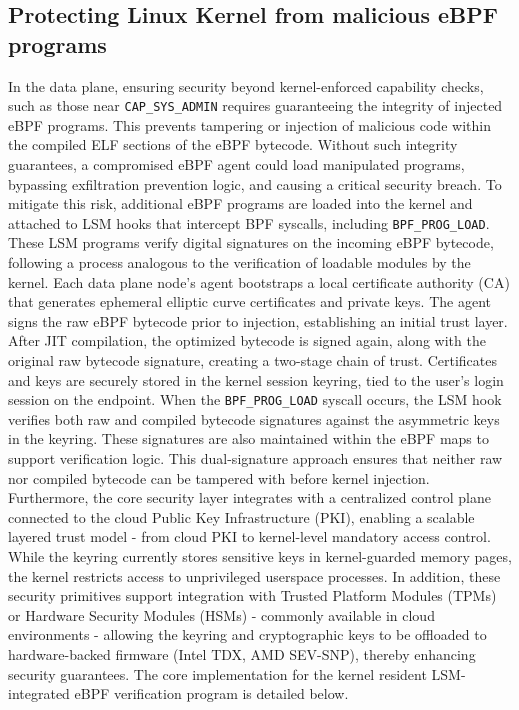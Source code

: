 \documentclass [11pt, proquest] {uwthesis}[2020/02/24]
\begin{document}
\subsection{Protecting Linux Kernel from malicious eBPF programs}
In the data plane, ensuring security beyond kernel-enforced capability checks, such as those near \texttt{CAP\_SYS\_ADMIN} requires guaranteeing the integrity of injected eBPF programs. This prevents tampering or injection of malicious code within the compiled ELF sections of the eBPF bytecode. Without such integrity guarantees, a compromised eBPF agent could load manipulated programs, bypassing exfiltration prevention logic, and causing a critical security breach.
To mitigate this risk, additional eBPF programs are loaded into the kernel and attached to LSM hooks that intercept BPF syscalls, including  \texttt{BPF\_PROG\_LOAD}. These LSM programs verify digital signatures on the incoming eBPF bytecode, following a process analogous to the verification of loadable modules by the kernel.
Each data plane node’s agent bootstraps a local certificate authority (CA) that generates ephemeral elliptic curve certificates and private keys. The agent signs the raw eBPF bytecode prior to injection, establishing an initial trust layer. After JIT compilation, the optimized bytecode is signed again, along with the original raw bytecode signature, creating a two-stage chain of trust. Certificates and keys are securely stored in the kernel session keyring, tied to the user’s login session on the endpoint.
When the \texttt{BPF\_PROG\_LOAD} syscall occurs, the LSM hook verifies both raw and compiled bytecode signatures against the asymmetric keys in the keyring. These signatures are also maintained within the eBPF maps to support verification logic. This dual-signature approach ensures that neither raw nor compiled bytecode can be tampered with before kernel injection.
Furthermore, the core security layer integrates with a centralized control plane connected to the cloud Public Key Infrastructure (PKI), enabling a scalable layered trust model - from cloud PKI to kernel-level mandatory access control. While the keyring currently stores sensitive keys in kernel-guarded memory pages, the kernel restricts access to unprivileged userspace processes. In addition, these security primitives support integration with Trusted Platform Modules (TPMs) or Hardware Security Modules (HSMs) - commonly available in cloud environments - allowing the keyring and cryptographic keys to be offloaded to hardware-backed firmware (Intel TDX, AMD SEV-SNP), thereby enhancing security guarantees. The core implementation for the kernel resident LSM-integrated eBPF verification program is detailed below.
\end{document}
